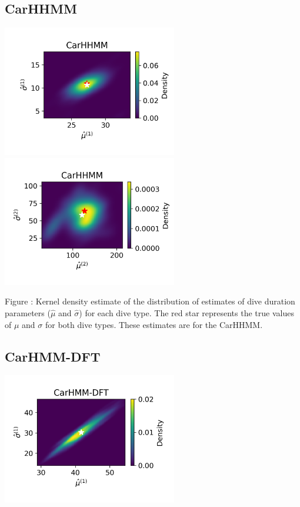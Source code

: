 \documentclass{article}
\begin{document}
        \subsection{CarHHMM}
        \begin{center}
        \includegraphics[width=3in]{../Plots/hhmm_V_MLE_density_dive_duration_-1_0.png}
        \includegraphics[width=3in]{../Plots/hhmm_V_MLE_density_dive_duration_-1_1.png}
        \end{center}
        
        \noindent Figure : Kernel density estimate of the distribution of estimates of dive duration parameters ($\hat \mu$ and $\hat \sigma$) for each dive type. The red star represents the true values of $\mu$ and $\sigma$ for both dive types. These estimates are for the CarHHMM.
        \addtocounter{fignum}{1}
        
        \subsection{CarHMM-DFT}
        \begin{center}
        \includegraphics[width=3in]{../Plots/hmm_FV_MLE_density_dive_duration_-1_0.png}
        \end{center}
        
\end{document}
